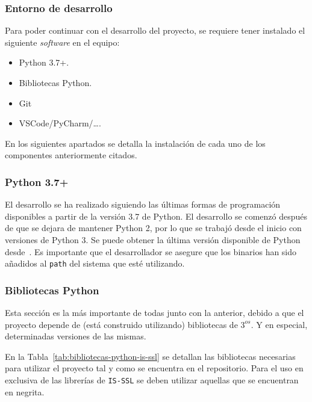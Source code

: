 \subsubsection{Entorno de desarrollo}
Para poder continuar con el desarrollo del proyecto, se requiere tener instalado el siguiente \textit{software} en el equipo:
\begin{itemize}
\tightlist
\item Python 3.7+.
\item Bibliotecas Python.
\item Git
\item VSCode/PyCharm/\dots.
\end{itemize}

En los siguientes apartados se detalla la instalación de cada uno de los componentes anteriormente citados.

\subsubsection{Python 3.7+}
El desarrollo se ha realizado siguiendo las últimas formas de programación disponibles a partir de la versión 3.7 de Python. El desarrollo se comenzó después de que se dejara de mantener Python 2, por lo que se trabajó desde el inicio con versiones de Python 3. Se puede obtener la última versión disponible de Python desde~\cite{pythonGetIt}. Es importante que el desarrollador se asegure que los binarios han sido añadidos al \texttt{path} del sistema que esté utilizando.

\subsubsection{Bibliotecas Python}
Esta sección es la más importante de todas junto con la anterior, debido a que el proyecto depende de (está construido utilizando) bibliotecas de $3^{os}$. Y en especial, determinadas versiones de las mismas. 

En la Tabla~\ref{tab:bibliotecas-python-is-ssl} se detallan las bibliotecas necesarias para utilizar el proyecto tal y como se encuentra en el repositorio. Para el uso en exclusiva de las librerías de \texttt{IS-SSL} se deben utilizar aquellas que se encuentran en negrita.

